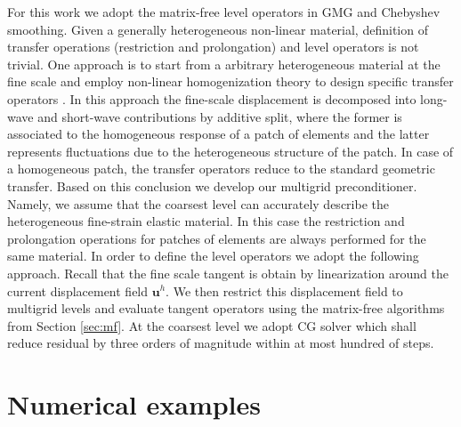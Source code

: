 \documentclass[preprint,12pt,times]{elsarticle}
\def\gz  #1{           \mbox{$\boldsymbol{#1}$}}
\begin{document}
For this work we adopt the matrix-free level operators in GMG and Chebyshev smoothing. Given a generally heterogeneous non-linear material, definition of transfer operations (restriction and prolongation) and level operators is not trivial. One approach is to start from a arbitrary heterogeneous material at the fine scale and employ non-linear homogenization theory to design specific  transfer operators \cite{Miehe2007}. In this approach the fine-scale displacement is decomposed into long-wave and short-wave contributions by additive split, where the former is associated to the homogeneous response of a patch of elements and the latter represents fluctuations due to the heterogeneous structure of the patch. In case of a homogeneous patch, the transfer operators reduce to the standard geometric transfer. Based on this conclusion we develop our multigrid preconditioner. Namely, we assume that the coarsest level can accurately describe the heterogeneous fine-strain elastic material. In this case the restriction and prolongation operations for patches of elements are always performed for the same material. In order to define the level operators we adopt the following approach. Recall that the fine scale tangent is obtain by linearization around the current displacement field $\gz u^h$. We then restrict this displacement field to multigrid levels and evaluate tangent operators using the matrix-free algorithms from Section \ref{sec:mf}. At the coarsest level we adopt CG solver which shall reduce residual by three orders of magnitude within at most hundred of steps.

\section{Numerical examples}
\label{sec:example}
\end{document}
